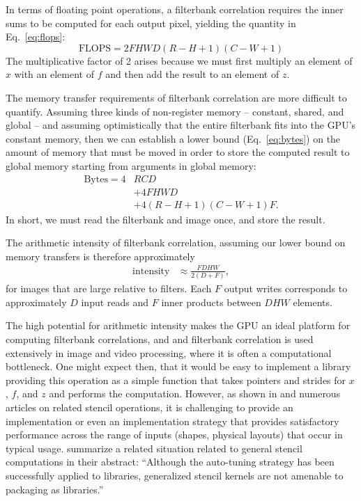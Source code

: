 \documentclass{sig-alternate}
\begin{document}
In terms of floating point operations, a filterbank correlation requires the
inner sums to be computed for each output pixel, yielding the quantity in
Eq.~\ref{eq:flops}:
\begin{equation}
\mathrm{FLOPS} = 2  F  H  W  D  (R - H + 1)( C- W + 1)
\label{eq:flops}
\end{equation}
The multiplicative factor of 2 arises because we must first multiply an element of
$x$ with an element of $f$ and then add the result to an element of $z$.

The memory transfer requirements of filterbank correlation are more difficult to quantify.
Assuming three kinds of non-register memory -- constant, shared, and global --
and assuming optimistically that the entire filterbank fits into the GPU's constant memory,
then we can establish a lower bound (Eq.~\ref{eq:bytes}) on the amount of
memory that must be moved in order to store the computed result to global
memory starting from arguments in global memory:
\begin{align}
\mathrm{Bytes} = 4&RCD \nonumber \\
& + 4FHWD \nonumber \\
& + 4(R-H+1)(C-W+1)F.
\label{eq:bytes}
\end{align}
In short, we must read the filterbank and image once, and store the result.

The arithmetic intensity of filterbank correlation, assuming our lower bound on memory transfers
is therefore approximately
\begin{align}
\mathrm{intensity} & \approx \frac {FDHW} {2(D+F)},
\end{align}
for images that are large relative to filters.
Each $F$ output writes corresponds to approximately $D$ input reads
and $F$ inner products between $DHW$ elements.

The high potential for arithmetic intensity makes the GPU an ideal platform for computing filterbank correlations,
and and filterbank correlation is used extensively in image and video processing,
where it is often a computational bottleneck.
One might expect then, that it would be easy to implement a library providing
this operation as a simple function that takes pointers and strides for $x$, $f$, and $z$ and performs the computation.
However, as shown in \citet{pinto+cox:2011gcg} and numerous articles on
related stencil operations, %
it is challenging to provide an implementation
or even an implementation strategy that provides satisfactory performance
across the range of inputs (shapes, physical layouts) that occur in
typical usage.
\citet{kamil+etal:2009} summarize a related situation related to general stencil computations in their abstract:
``Although the auto-tuning strategy has been successfully applied to libraries,
generalized stencil kernels are not amenable to packaging as libraries.''
\end{document}
